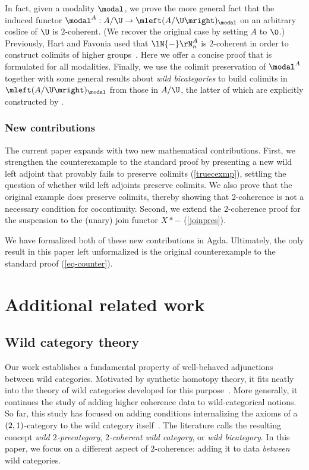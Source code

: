 \documentclass{lmcs}
\theoremstyle{definition}\newtheorem{note}[thm]{Note}
\begin{document}
In fact, given a modality $\modal$, we prove the more general fact that the induced functor $\modal^A : A/\U \to \mleft(A/\U\mright)_{\modal}$ on an arbitrary coslice of $\U$ is $2$-coherent. (We recover the original case by setting $A$ to $\0$.) Previously, Hart and Favonia used that $\lN{-}\rN_n^A$ is $2$-coherent in order to construct colimits of higher groups~\cite[Section 7]{CSL25}. Here we offer a concise proof that is formulated for all modalities. Finally, we use the colimit preservation of $\modal^A$ together with some general results about \emph{wild bicategories} to build colimits in $\mleft(A/\U\mright)_{\modal}$ from those in $A/\U$, the latter of which are explicitly constructed by \cite[Section 5]{CSL25}.

\subsubsection*{New contributions}
The current paper expands \cite{lapccsl} with two new mathematical contributions. First, we strengthen the counterexample to the standard proof by presenting a new wild left adjoint that provably fails to preserve colimits (\autoref{truecexmp}), settling the question of whether wild left adjoints preserve colimits. We also prove that the original example does preserve colimits, thereby showing that $2$-coherence is not a necessary condition for cocontinuity. Second, we extend the $2$-coherence proof for the suspension to the (unary) join functor $X \ast {-}$ (\autoref{joinpres}). 

We have formalized both of these new contributions in Agda. Ultimately, the only result in this paper left unformalized is the original counterexample to the standard proof (\autoref{eq-counter}).

\section{Additional related work}

\subsection{Wild category theory}

Our work establishes a fundamental property of well-behaved adjunctions between wild categories. Motivated by synthetic homotopy theory, it fits neatly into the theory of wild categories developed for this purpose~\cite{Hur, RK, smashmon}. More generally, it continues the study of adding higher coherence data to wild-categorical notions. So far, this study has focused on adding conditions internalizing the axioms of a $\mleft(2,1\mright)$-category to the wild category itself~\cite{chen, CK, CSL25}. The literature calls the resulting concept \emph{wild $2$-precategory}, \emph{$2$-coherent wild category}, or \emph{wild bicategory}.
In this paper, we focus on a different aspect of $2$-coherence: adding it to data \emph{between} wild categories.   
\end{document}
